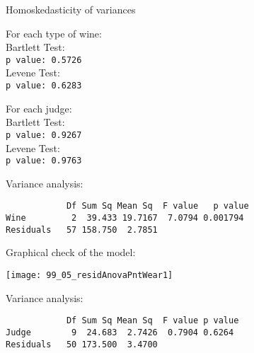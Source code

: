 \begin{frame}
  Homoskedasticity of variances\\
  \vspace{0.5cm}
  \begin{minipage}[t]{0.48\textwidth}
    For each type of wine:\\

    \vspace*{0.25cm}
    Bartlett Test:\\
    \texttt{p value: 0.5726}\\

    \vspace*{0.75cm}
    Levene Test:\\
    \texttt{p value: 0.6283}\\
  \end{minipage}
  \hfill
  \begin{minipage}[t]{0.48\textwidth}
    For each judge:\\

    \vspace*{0.25cm}
    Bartlett Test:\\
    \texttt{p value: 0.9267}\\

    \vspace*{0.75cm}
    Levene Test:\\
    \texttt{p value: 0.9763}\\
  \end{minipage}
\end{frame}

\begin{frame}[fragile]
  \vspace{0.25cm}
  Variance analysis:
  \begin{verbatim}
            Df Sum Sq Mean Sq  F value   p value  
Wine         2  39.433 19.7167  7.0794 0.001794
Residuals   57 158.750  2.7851   
  \end{verbatim}
\end{frame}

\begin{frame}
   Graphical check of the model:\\
  \vspace{.1cm}
  \begin{center}
    \texttt{[image: 99\_05\_residAnovaPntWear1]}
    \end{center}
\end{frame}

\begin{frame}[fragile]
  \vspace{0.25cm}
  Variance analysis:
  \begin{verbatim}
            Df Sum Sq Mean Sq  F value p value  
Judge        9  24.683  2.7426  0.7904 0.6264
Residuals   50 173.500  3.4700    
  \end{verbatim}
\end{frame}

